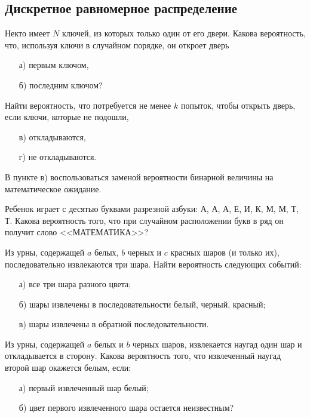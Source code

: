 \subsection{Дискретное равномерное распределение}

\begin{problem}
Некто имеет $N$ ключей, из которых только один от его двери. Какова вероятность, что, используя ключи в случайном порядке, 
он откроет дверь 
\begin{enumerate}
\item[а)] первым ключом, 
\item[б)] последним ключом? 
\end{enumerate}
Найти вероятность, что потребуется не менее $k$ попыток, чтобы открыть дверь, если ключи, которые не подошли, 
\begin{enumerate}
\item[в)] откладываются, 
\item[г)] не откладываются. 
\end{enumerate}

\begin{ordre}
В пункте в) воспользоваться заменой вероятности бинарной величины на математическое ожидание.
\end{ordre}

\end{problem}


\begin{problem}
Ребенок играет с десятью буквами разрезной азбуки: А, А, А, Е, И, К, М, М, Т, Т. 
Какова вероятность того, что при случайном расположении букв в ряд он получит слово <<МАТЕМАТИКА>>? 
\end{problem}


\begin{problem}
Из урны, содержащей $a$ белых, $b$ черных и $c$ красных шаров (и только их), последовательно извлекаются три шара. Найти 
вероятность следующих событий: 
\begin{enumerate}
\item[а)] все три шара разного цвета; 
\item[б)] шары извлечены в последовательности белый, черный, красный; 
\item[в)] шары извлечены в обратной последовательности. 
\end{enumerate}
\end{problem}



\begin{problem}
Из урны, содержащей $a$ белых и $b$ черных шаров, извлекается наугад один шар и откладывается в сторону. Какова вероятность 
того, что извлеченный наугад второй шар окажется белым, если: 
\begin{enumerate}
\item[а)] первый извлеченный шар белый; 
\item[б)] цвет  первого извлеченного шара остается неизвестным? 
\end{enumerate}
\end{problem}




